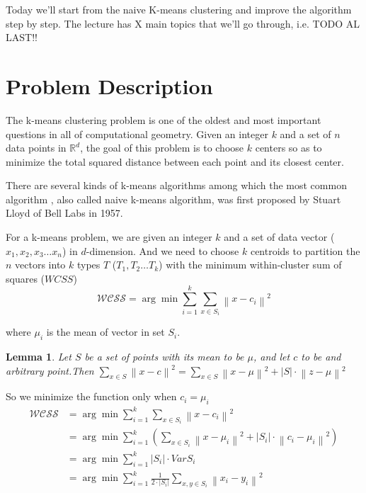 \documentclass[11pt]{article}
\newtheorem{lemma}[theorem]{Lemma}
\begin{document}
\par Today we'll start from the naive K-means clustering and improve the algorithm step by step. The lecture has X main topics that we'll go through, i.e. TODO AL LAST!!

\section{Problem Description}
\par The k-means clustering problem is one of the oldest and most important questions in all of computational geometry. Given an integer $k$ and a set of $n$ data points in $\mathbb{R}^{d}$, the goal of this problem is to choose $k$ centers so as to minimize the total squared distance between each point and its closest center.\cite{kmeanspp}
\par There are several kinds of k-means algorithms among which the most common algorithm , also called naive k-means algorithm, was first proposed by Stuart Lloyd\cite{Least-squares-quantization-in-PCM} of Bell Labs in 1957.
\par For a k-means problem, we are given an integer $k$ and a set of data vector ($x_1, x_2, x_3 \dots x_n$) in $d$-dimension. And we need to choose $k$ centroids to partition the $n$ vectors into $k$ types $T$ ($T_1, T_2 \dots T_k$) with the minimum within-cluster sum of squares ($WCSS$)
$$\mathcal{WCSS} = \arg \min \sum_{i=1}^{k} \sum_{x \in S_i } {\left\lVert x - c _i \right\rVert }^2  $$
\par where $\mu_i$ is the mean of vector in set $S_i$.

\begin{lemma}
  Let $S$ be a set of points with its mean to be $\mu$, and let $c$ to be and arbitrary point.Then $\sum_{x \in S}{\left\lVert x - c\right\rVert}^2 = \sum_{x \in S}{\left\lVert x - \mu\right\rVert}^2 + \left\lvert S \right\rvert \cdot {\left\lVert z - \mu\right\rVert}^2 $
\end{lemma}
\par So we minimize the function only when $c_i=\mu_i$
\begin{equation*}
  \begin{split}
    \mathcal{WCSS} & = \arg \min \sum_{i=1}^{k} \sum_{x \in S_i } {\left\lVert x - c _i \right\rVert }^2 \\
    & = \arg \min \sum_{i=1}^{k} (\sum_{x \in S_i} {\left\lVert x - \mu_i\right\rVert}^2 + \left\lvert S_i \right\rvert \cdot {\left\lVert c_i - \mu_i\right\rVert}^2) \\
    & = \arg \min \sum_{i=1}^{k} {\left\lvert S_i \right\rvert }\cdot Var S_i \\
    & = \arg \min \sum_{i=1}^{k} \frac{1}{2\cdot\left\lvert S_i\right\rvert } \sum_{x,y \in S_i} {\left\lVert x_i - y_i\right\rVert }^2
  \end{split}
\end{equation*}
\end{document}

